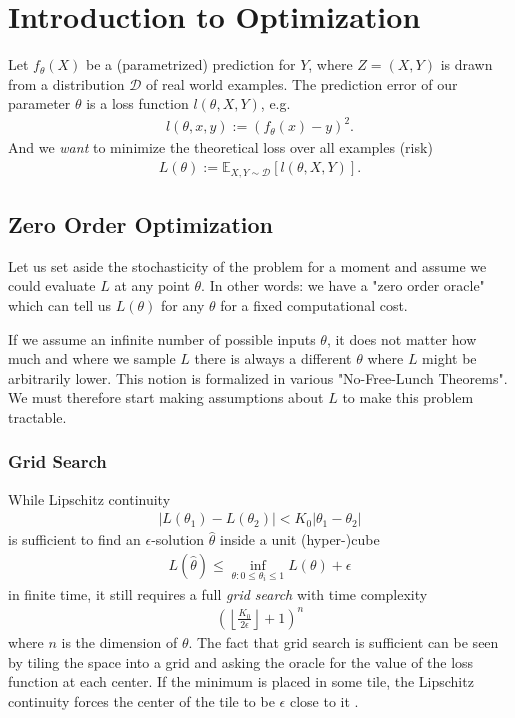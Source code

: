 \newcommand{\dist}{\mathcal{D}}
\newcommand{\E}{\mathbb{E}}

\chapter{Introduction to Optimization}


Let \(f_\theta(X)\) be a (parametrized) prediction for \(Y\), where \(Z=(X,Y)\)
is drawn from a distribution \(\dist\) of real world examples. The prediction
error of our parameter \(\theta\) is a loss function \(l(\theta, X, Y)\), e.g. 
%
\begin{align*}
	l(\theta, x, y) := (f_\theta(x) - y)^2.
\end{align*}
%
And we \emph{want} to minimize the theoretical loss over all examples (risk)
%
\begin{align*}
	L(\theta) := \E_{X,Y\sim \dist} [l(\theta, X, Y)].
\end{align*}

\section{Zero Order Optimization}

Let us set aside the stochasticity of the problem for a moment and assume we
could evaluate \(L\) at any point \(\theta\). In other words: we have a "zero
order oracle" which can tell us \(L(\theta)\) for any \(\theta\) for a fixed
computational cost.

If we assume an infinite number of possible inputs \(\theta\), it does not matter
how much and where we sample \(L\) there is always a different \(\theta\) where
\(L\) might be arbitrarily lower. This notion is formalized in various "No-Free-Lunch
Theorems". We must therefore start making assumptions about \(L\) to make this
problem tractable.

\subsection{Grid Search}


While Lipschitz continuity 
%
\begin{align*}
	| L(\theta_1) - L(\theta_2) | < K_0 | \theta_1 - \theta_2 |
\end{align*}
%
is sufficient to find an \(\epsilon\)-solution \(\hat{\theta}\) inside a unit
(hyper-)cube
%
\begin{align*}
	L(\hat{\theta}) \le \inf_{\theta: 0\le\theta_i\le 1} L(\theta) + \epsilon
\end{align*}
%
in finite time, it still requires a full \emph{grid search} with time complexity
%
\begin{align*}
	\left(\left\lfloor \frac{K_0}{2\epsilon}\right\rfloor + 1\right)^n
\end{align*}
%
where \(n\) is the dimension of \(\theta\). The fact that grid search is
sufficient can be seen by tiling the space into a grid and asking the oracle
for the value of the loss function at each center. If the minimum is placed in
some tile, the Lipschitz continuity forces the center of the tile to be \(\epsilon\)
close to it \parencite[cf.][p. 11]{nesterovLecturesConvexOptimization2018}.

